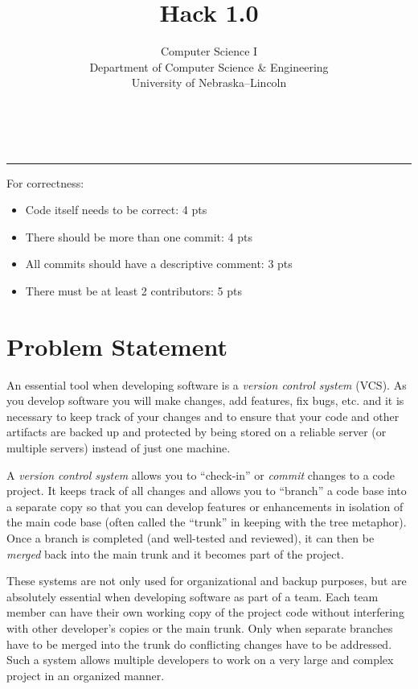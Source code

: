 \documentclass[12pt]{scrartcl}
\title{Hack 1.0}\let\Title\@title
\subtitle{Computer Science I\\
{\small
\vskip1cm
Department of Computer Science \& Engineering \\
University of Nebraska--Lincoln}
\vskip-1cm}
\date{~}
\begin{document}
\maketitle

\hrule



For correctness:
\begin{itemize}
  \item Code itself needs to be correct: 4 pts
  \item There should be more than one commit: 4 pts
  \item All commits should have a descriptive comment: 3 pts
  \item There must be at least 2 contributors: 5 pts
\end{itemize}

\section*{Problem Statement}

An essential tool when developing software is a \emph{version control system}
(VCS).  As you develop software you will make changes, add features, fix bugs, etc.
and it is necessary to keep track of your changes and to ensure that your 
code and other artifacts are backed up and protected by being stored on a 
reliable server (or multiple servers) instead of just one machine.  

A \emph{version control system} allows you to ``check-in'' or 
\emph{commit} changes to a code project.  It keeps track of all changes 
and allows you to ``branch'' a code base into a separate copy so that 
you can develop features or enhancements in isolation of the
main code base (often called the ``trunk'' in keeping with the tree 
metaphor).  Once a branch is completed (and well-tested and 
reviewed), it can then be \emph{merged} back into the main trunk 
and it becomes part of the project.

These systems are not only used for organizational and backup 
purposes, but are absolutely essential when developing software 
as part of a team.  Each team member can have their own working 
copy of the project code without interfering with other developer's 
copies or the main trunk.  Only when separate branches have to 
be merged into the trunk do conflicting changes have to be addressed.  
Such a system allows multiple developers to work on a 
very large and complex project in an organized manner.
\end{document}
